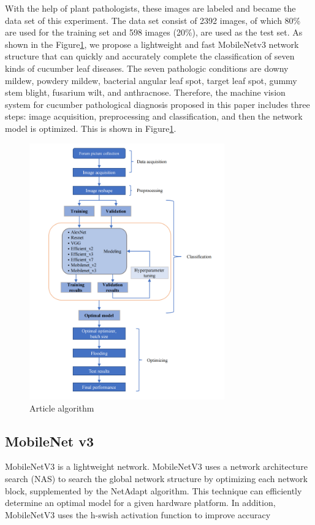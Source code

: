 \documentclass[a4paper,fleqn]{cas-sc}
\begin{document}
With the help of plant pathologists, these images are labeled and became the data set of this experiment. The data set consist of 2392 images, of which 80\% are used for the training set and 598 images (20\%), are used as the test set. As shown in the Figure\ref{fig:f2}, we propose a lightweight and fast MobileNetv3 network structure that can quickly and accurately complete the classification of seven kinds of cucumber leaf diseases. The seven pathologic conditions are downy mildew, powdery mildew, bacterial angular leaf spot, target leaf spot, gummy stem blight, fusarium wilt, and anthracnose. Therefore, the machine vision system for cucumber pathological diagnosis  proposed in this paper includes three steps: image acquisition, preprocessing and classification, and then the network model is optimized. This is shown in Figure\ref{fig:f2}.
\begin{figure}
\centering
\includegraphics[width=0.75\textwidth]{figs_rev1/f2.png}
\caption{Article algorithm}
\label{fig:f2}
\end{figure}

\subsection{MobileNet v3}
MobileNetV3 is a lightweight network. MobileNetV3 uses a network architecture search (NAS) to search the global network structure by optimizing each network block, supplemented by the NetAdapt algorithm. This technique can efficiently determine an optimal model for a given hardware platform. In addition, MobileNetV3 uses the h-swish activation function to improve accuracy \citep{howard2019searching}
\end{document}
